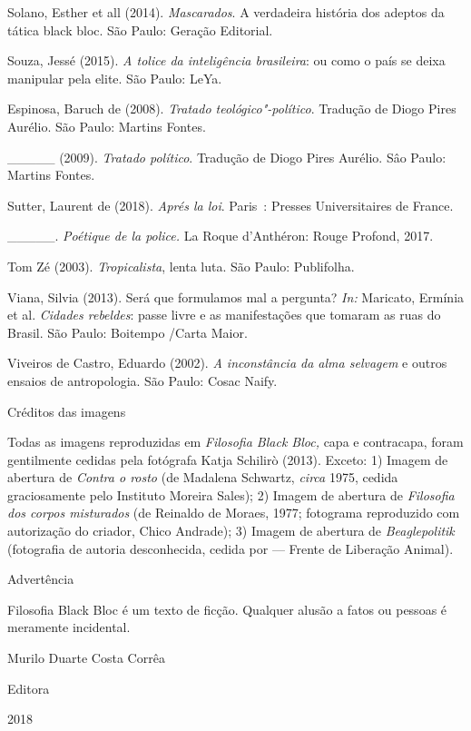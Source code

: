 Solano, Esther et all (2014). \emph{Mascarados}. A verdadeira história
dos adeptos da tática black bloc. São Paulo: Geração Editorial.

Souza, Jessé (2015).\emph{ A tolice da inteligência brasileira}: ou como
o país se deixa manipular pela elite. São Paulo: LeYa.

Espinosa, Baruch de (2008). \emph{Tratado teológico"-político}. Tradução
de Diogo Pires Aurélio. São Paulo: Martins Fontes.

\_\_\_\_\_ (2009). \emph{Tratado político}. Tradução de Diogo Pires
Aurélio. Sâo Paulo: Martins Fontes.

Sutter, Laurent de (2018). \emph{Aprés la loi}. Paris~: Presses
Universitaires de France.

\_\_\_\_\_. \emph{Poétique de la police.} La Roque d'Anthéron: Rouge
Profond, 2017.

Tom Zé (2003). \emph{Tropicalista}, lenta luta. São Paulo: Publifolha.

Viana, Silvia (2013). Será que formulamos mal a pergunta? \emph{In:
}Maricato, Ermínia et al. \emph{Cidades rebeldes}: passe livre e as
manifestações que tomaram as ruas do Brasil. São Paulo: Boitempo /Carta
Maior.

Viveiros de Castro, Eduardo (2002). \emph{A inconstância da alma
selvagem }e outros ensaios de antropologia. São Paulo: Cosac Naify.

Créditos das imagens

Todas as imagens reproduzidas em \emph{Filosofia Black Bloc, }capa e
contracapa, foram gentilmente cedidas pela fotógrafa Katja
Schilirò (2013). Exceto: 1) Imagem de abertura de \emph{Contra o rosto}
(de Madalena Schwartz, \emph{circa} 1975, cedida graciosamente pelo
Instituto Moreira Sales); 2) Imagem de abertura de \emph{Filosofia dos
corpos misturados} (de Reinaldo de Moraes, 1977; fotograma reproduzido
com autorização do criador, Chico Andrade); 3) Imagem de abertura de
\emph{Beaglepolitik} (fotografia de autoria desconhecida, cedida por 
--- Frente de Liberação Animal).

Advertência

Filosofia Black Bloc é um texto de ficção. Qualquer alusão a fatos ou
pessoas é meramente incidental.

Murilo Duarte Costa Corrêa


Editora

2018
